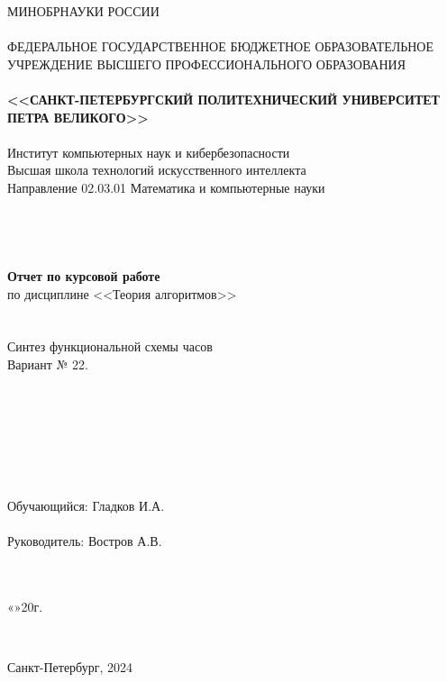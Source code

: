 \documentclass[10pt,a4paper,final]{article} %
\begin{document}
\thispagestyle{empty}

\begin{center}
	{\Large МИНОБРНАУКИ РОССИИ}\\
	~\\
	{\large ФЕДЕРАЛЬНОЕ ГОСУДАРСТВЕННОЕ БЮДЖЕТНОЕ ОБРАЗОВАТЕЛЬНОЕ УЧРЕЖДЕНИЕ ВЫСШЕГО ПРОФЕССИОНАЛЬНОГО ОБРАЗОВАНИЯ}\\
	~\\
	{\Large \bf <<САНКТ-ПЕТЕРБУРГСКИЙ ПОЛИТЕХНИЧЕСКИЙ УНИВЕРСИТЕТ ПЕТРА ВЕЛИКОГО>>}\\
	~\\
	{\large Институт компьютерных наук и кибербезопасности}\\
	{\large Высшая школа технологий искусственного интеллекта}\\
	{\large Направление 02.03.01 Математика и компьютерные науки}\\
	~\\
	~\\
	~\\
	~\\
	{\Large \bf Отчет по курсовой работе}\\
	{\Large по дисциплине <<Теория алгоритмов>> }\\
	~\\
	~\\
	
	{\Large Синтез функциональной схемы часов}\\
		{\large  Вариант № 22.}\\ 	
	
	~\\
	~\\
	~\\
	~\\
	~\\
	~\\
	~\\
	{\large Обучающийся: \underline{\hspace{3.5cm}} \qquad\qquad Гладков И.А.}\\
	~\\
	{\large Руководитель: \underline{\hspace{3.5cm}} \hspace{16mm} Востров А.В.}\\
	~\\
	~\\
\end{center}
\begin{flushright}
	
	«\underline{\hspace{1cm}}»\underline{\hspace{3cm}}20\underline{\hspace{0.7cm}}г.
\end{flushright}
~\\
\begin{center}
	{\large Санкт-Петербург, 2024}
\end{center}
\newpage
\end{document}
